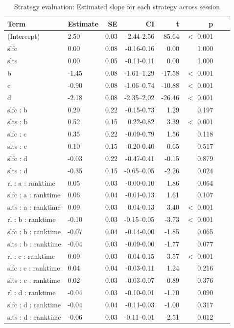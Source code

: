\documentclass[pdflatex,sn-nature]{sn-jnl}%
\theoremstyle{thmstyleone}%
\theoremstyle{thmstyletwo}%
\theoremstyle{thmstylethree}%
\begin{document}
\begin{appendices}
\begin{table}[h!]
\caption{Strategy evaluation: Estimated slope for each strategy across session}\label{table_strategyevaluation_slopestrategy}
\centering
\begin{tabular}{llrrrrrr}
  \hline
 Term & Estimate & SE & CI & t & p \\ 
  \hline
(Intercept) & 2.50 & 0.03 & 2.44-2.56 & 85.64 &  $<$  0.001 \\ 
  slfc & 0.00 & 0.08 & -0.16-0.16 & 0.00 &    1.000 \\ 
  slts & 0.00 & 0.05 & -0.11-0.11 & 0.00 &    1.000 \\ 
  b & -1.45 & 0.08 & -1.61--1.29 & -17.58 &  $<$  0.001 \\ 
  c & -0.90 & 0.08 & -1.06--0.74 & -10.88 &  $<$  0.001 \\ 
  d & -2.18 & 0.08 & -2.35--2.02 & -26.46 &  $<$  0.001 \\ 
  slfc : b & 0.29 & 0.22 & -0.15-0.73 & 1.29 &    0.197 \\ 
  slts : b & 0.52 & 0.15 & 0.22-0.82 & 3.39 &  $<$  0.001 \\ 
  slfc : c & 0.35 & 0.22 & -0.09-0.79 & 1.56 &    0.118 \\ 
  slts : c & 0.10 & 0.15 & -0.20-0.40 & 0.65 &    0.517 \\ 
  slfc : d & -0.03 & 0.22 & -0.47-0.41 & -0.15 &    0.879 \\ 
  slts : d & -0.35 & 0.15 & -0.65--0.05 & -2.26 &    0.024 \\ 
rl : a : ranktime & 0.05 & 0.03 & -0.00-0.10 & 1.86 &    0.064 \\ 
slfc : a : ranktime & 0.06 & 0.04 & -0.01-0.13 & 1.61 &    0.107 \\ 
slts : a : ranktime & 0.09 & 0.03 & 0.04-0.13 & 3.40 &  $<$  0.001 \\ 
rl : b : ranktime & -0.10 & 0.03 & -0.15--0.05 & -3.73 &  $<$  0.001 \\ 
slfc : b : ranktime & -0.07 & 0.04 & -0.14-0.00 & -1.85 &    0.065 \\ 
slts : b : ranktime & -0.04 & 0.03 & -0.09-0.00 & -1.77 &    0.077 \\ 
rl : c : ranktime & 0.09 & 0.03 & 0.04-0.15 & 3.57 &  $<$  0.001 \\ 
slfc : c : ranktime & 0.04 & 0.04 & -0.03-0.11 & 1.24 &    0.216 \\ 
slts : c : ranktime & 0.02 & 0.03 & -0.03-0.07 & 0.89 &    0.376 \\ 
rl : d : ranktime & -0.04 & 0.03 & -0.10-0.01 & -1.70 &    0.090 \\ 
slfc : d : ranktime & -0.04 & 0.04 & -0.11-0.03 & -1.00 &    0.317 \\ 
slts : d : ranktime & -0.06 & 0.03 & -0.11--0.01 & -2.51 &    0.012 \\ 
   \hline
\end{tabular}
\end{table}




\end{appendices}
\end{document}
